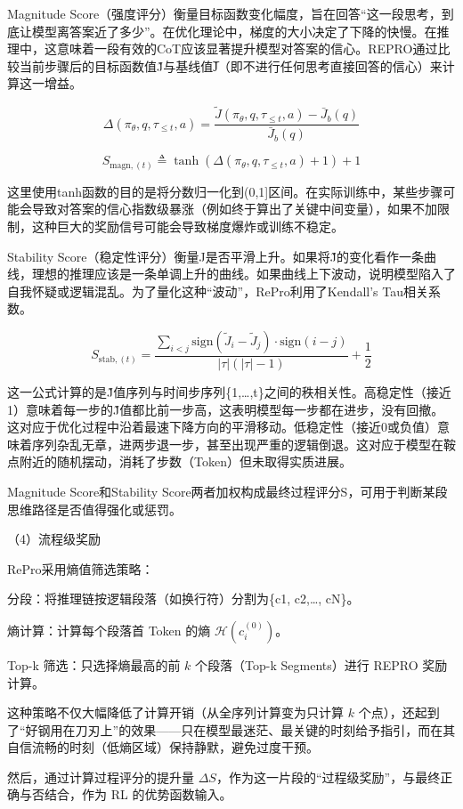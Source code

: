 Magnitude Score（强度评分）衡量目标函数变化幅度，旨在回答``这一段思考，到底让模型离答案近了多少''。在优化理论中，梯度的大小决定了下降的快慢。在推理中，这意味着一段有效的CoT应该显著提升模型对答案的信心。REPRO通过比较当前步骤后的目标函数值J̃与基线值J̅（即不进行任何思考直接回答的信心）来计算这一增益。

\[
\Delta(\pi_\theta, q, \tau_{\le t}, a)
=
\frac{
\tilde{J}(\pi_\theta, q, \tau_{\le t}, a) - \bar{J}_b(q)
}{
\bar{J}_b(q)
}
\]

\[
S_{\mathrm{magn},(t)}
\triangleq
\tanh\left(\Delta(\pi_\theta, q, \tau_{\le t}, a) + 1\right) + 1
\]

这里使用tanh函数的目的是将分数归一化到(0,1{]}区间。在实际训练中，某些步骤可能会导致对答案的信心指数级暴涨（例如终于算出了关键中间变量），如果不加限制，这种巨大的奖励信号可能会导致梯度爆炸或训练不稳定。

Stability Score（稳定性评分）衡量J是否平滑上升。如果将J̃的变化看作一条曲线，理想的推理应该是一条单调上升的曲线。如果曲线上下波动，说明模型陷入了自我怀疑或逻辑混乱。为了量化这种``波动''，RePro利用了Kendall's Tau相关系数。

\[
S_{\mathrm{stab},(t)}
=
\frac{
\sum_{i < j}
\mathrm{sign}(\tilde{J}_i - \tilde{J}_j)\cdot \mathrm{sign}(i - j)
}{
|\tau|(|\tau| - 1)
}
+
\frac{1}{2}
\]

这一公式计算的是J̃值序列与时间步序列\{1,\ldots,t\}之间的秩相关性。高稳定性（接近1）意味着每一步的J̃值都比前一步高，这表明模型每一步都在进步，没有回撤。这对应于优化过程中沿着最速下降方向的平滑移动。低稳定性（接近0或负值）意味着序列杂乱无章，进两步退一步，甚至出现严重的逻辑倒退。这对应于模型在鞍点附近的随机摆动，消耗了步数（Token）但未取得实质进展。

Magnitude Score和Stability Score两者加权构成最终过程评分S，可用于判断某段思维路径是否值得强化或惩罚。

（4）流程级奖励

RePro采用熵值筛选策略：

分段：将推理链按逻辑段落（如换行符\n\n）分割为\{c1, c2,\ldots, cN\}。

熵计算：计算每个段落首 Token 的熵 \(\mathcal{H}(c_i^{(0)})\)。

Top-k 筛选：只选择熵最高的前 \(k\) 个段落（Top-k Segments）进行 REPRO 奖励计算。

这种策略不仅大幅降低了计算开销（从全序列计算变为只计算 \(k\) 个点），还起到了``好钢用在刀刃上''的效果------只在模型最迷茫、最关键的时刻给予指引，而在其自信流畅的时刻（低熵区域）保持静默，避免过度干预。

然后，通过计算过程评分的提升量 \(\Delta S\)，作为这一片段的``过程级奖励''，与最终正确与否结合，作为 RL 的优势函数输入。

